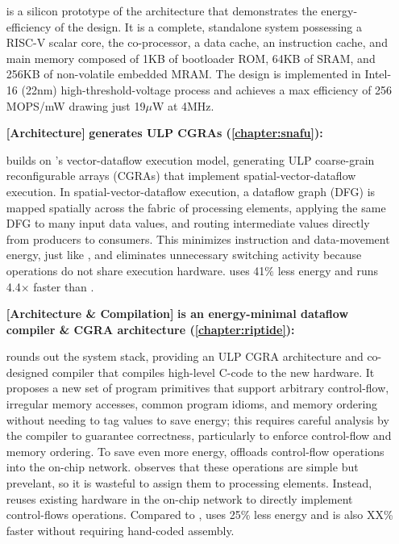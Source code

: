 \begin{itemize}
\manicsilicon is a silicon prototype of the \manic architecture that demonstrates the energy-efficiency of the design.
% 
It is a complete, standalone system possessing a RISC-V scalar core, the \manic co-processor, a data cache, an instruction cache, and main memory composed of 1KB of bootloader ROM, 64KB of SRAM, and 256KB of non-volatile embedded MRAM.
% 
The design is implemented in Intel-16 (22nm) high-threshold-voltage process and achieves a max efficiency of 256 MOPS/mW drawing just 19$\mu$W at 4MHz.

\item[\textbf{[Architecture]}]
\textbf{\snafu generates ULP CGRAs (\autoref{chapter:snafu}): }

\snafu builds on \manic's vector-dataflow execution model, generating ULP coarse-grain reconfigurable arrays (CGRAs) that implement spatial-vector-dataflow execution.
% 
In spatial-vector-dataflow execution, a dataflow graph (DFG) is mapped spatially across the fabric of processing elements, applying the same DFG to many input data values, and routing intermediate values directly from producers to consumers.
% 
This minimizes instruction and data-movement energy, just like \manic, and eliminates unnecessary switching activity because operations do not share execution hardware.
% 
\snafu uses 41$\%$ less energy and runs 4.4$\times$ faster than \manic.

\item[\textbf{[Architecture \& Compilation]}]
\textbf{\riptide is an energy-minimal dataflow compiler \& CGRA architecture (\autoref{chapter:riptide}): }

\riptide rounds out the system stack, providing an ULP CGRA architecture and co-designed compiler that compiles high-level C-code to the new hardware.
% 
It proposes a new set of program primitives that support arbitrary control-flow, irregular memory accesses, common program idioms, and memory ordering without needing to tag values to save energy; this requires careful analysis by the compiler to guarantee correctness, particularly to enforce control-flow and memory ordering.
% 
To save even more energy, \riptide offloads control-flow operations into the on-chip network.
% 
\riptide observes that these operations are simple but prevelant, so it is wasteful to assign them to processing elements.
% 
Instead, \riptide reuses existing hardware in the on-chip network to directly implement control-flows operations.
% 
Compared to \snafu, \riptide uses 25\% less energy and is also XX\% faster without requiring hand-coded assembly.

\end{itemize}

